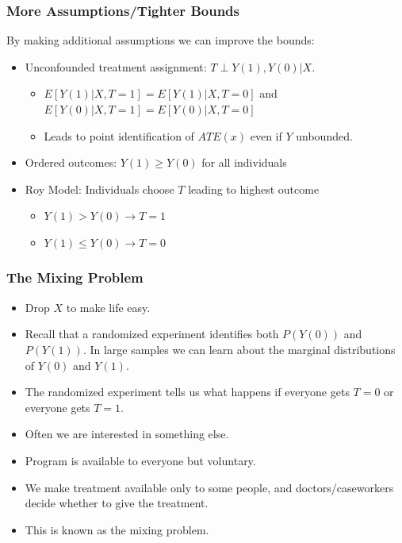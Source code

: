 \documentclass[xcolor=pdftex,dvipsnames,table,mathserif]{beamer}
\begin{document}
\begin{frame}
\frametitle{More Assumptions/Tighter Bounds}
By making additional assumptions we can improve the bounds:
\begin{itemize}
\item Unconfounded treatment assignment: $T \perp Y(1),Y(0) | X$.
\begin{itemize}
\item $E[Y(1) | X, T=1] = E[Y(1) | X,T=0]$ and $E[Y(0) | X, T=1] = E[Y(0) | X,T=0]$
\item  Leads to point identification of $ATE(x)$ even if $Y$ unbounded.
\end{itemize}
\item Ordered outcomes: $Y(1) \geq Y(0)$ for all individuals
\item Roy Model: Individuals choose $T$ leading to highest outcome
\begin{itemize}
\item $Y(1) > Y(0) \rightarrow T=1$
\item $Y(1) \leq Y(0) \rightarrow T=0$
\end{itemize}
\end{itemize}
\end{frame}


\begin{frame}
\frametitle{The Mixing Problem}
\begin{itemize}
\item Drop $X$ to make life easy.
\item Recall that a randomized experiment identifies both $P(Y(0))$ and $P(Y(1))$. In large samples we can learn about the \alert{marginal distributions} of $Y(0)$ and $Y(1)$.
\item The randomized experiment tells us what happens if everyone gets $T=0$ or everyone gets $T=1$.
\item Often we are interested in something else.
\item Program is available to everyone but voluntary.
\item We make treatment available only to some people, and doctors/caseworkers decide whether to give the treatment.
\item This is known as the \alert{mixing problem}.
\end{itemize}
\end{frame}

\end{document}

